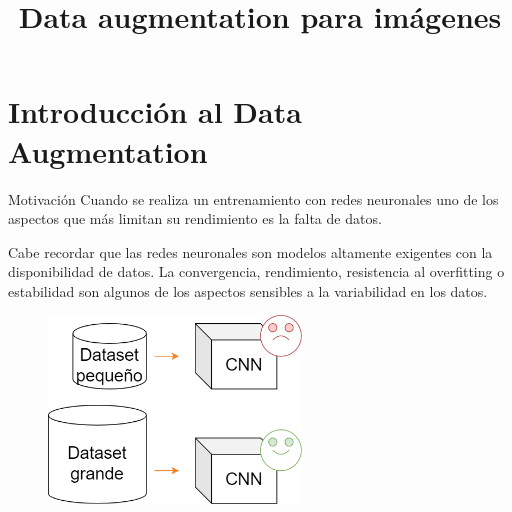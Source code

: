



\title{Data augmentation para imágenes}


\maketitle

\section{Introducción al Data Augmentation}

\begin{frame}{Motivación}
Cuando se realiza un \alert{entrenamiento} con redes neuronales uno de los aspectos que más \alert{limitan su rendimiento} es la falta de datos.

Cabe recordar que las redes neuronales son modelos \alert{altamente exigentes} con la disponibilidad de datos. La \alert{convergencia}, \alert{rendimiento}, \alert{resistencia al overfitting} o \alert{estabilidad} son algunos de los aspectos sensibles a la variabilidad en los datos.

\begin{figure}
    \centering
    \includegraphics[width=0.6\textwidth]{figures/Tema 3/DA_Performance.png}
\end{figure}
\end{frame}

